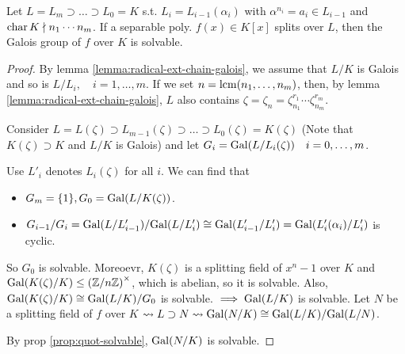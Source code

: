 \begin{theorem}[Part A] \label{thm:solvable-part-a}
  Let $L = L_m \supset \dots \supset L_0 = K$ s.t. $L_i = L_{i-1}(\alpha_i)$
  with $\alpha^{n_i} = a_i \in L_{i-1}$ and $\operatorname{char} K \nmid n_1\cdots n_m$.
  If a separable poly. $f(x) \in K[x]$ splits over $L$, then the Galois group
  of $f$ over $K$ is solvable.
  
  \begin{proof}
    By lemma \ref{lemma:radical-ext-chain-galois}, we assume that $L/K$ is
    Galois and so is $L/L_i, \quad i=1,\dots,m$.
    If we set $n = \operatorname{lcm}(n_1, \dots, n_m)$, then, by lemma \ref{lemma:radical-ext-chain-galois},
    $L$ also contains $\zeta = \zeta_n = \zeta_{n_1}^{r_1} \cdots \zeta_{n_m}^{r_m}$.

    Consider $L = L(\zeta) \supset L_{m-1}(\zeta) \supset \dots \supset
    L_0(\zeta) = K(\zeta)$ (Note that $K(\zeta) \supset K$ and $L/K$ is Galois)
    and let $G_i = \operatorname{Gal}(L/L_i(\zeta)) \quad i = 0, \dots, m$.

    Use $L'_i$ denotes $L_i(\zeta)$ for all $i$. We can find that
    \begin{itemize}
      \item $G_m = \{1\}, G_0 = \operatorname{Gal}(L/K(\zeta))$.
      \item ${G_{i-1}}/{G_i} = {\operatorname{Gal}(L/L'_{i-1})}/{\operatorname{Gal}(L/L'_i)}
        \cong \operatorname{Gal}(L'_{i-1} / L'_i) =  \operatorname{Gal}(L'_i(\alpha_i) / L'_i)$ is cyclic.
    \end{itemize}
    So $G_0$ is solvable.
    Moreoevr, $K(\zeta)$ is a splitting field of $x^n - 1$ over $K$ and
    $\operatorname{Gal}(K(\zeta)/K) \le \left({\mathbb{Z}}/{n\mathbb{Z}}\right)^\times$, which is
    abelian, so it is solvable. Also, $\operatorname{Gal}(K(\zeta)/K) \cong {\operatorname{Gal}(L/K)}/{G_0}$
    is solvable. $\implies \operatorname{Gal}(L/K)$ is solvable.
    Let $N$ be a splitting field of $f$ over $K$ $\leadsto L \supset N \leadsto
    \operatorname{Gal}(N/K) \cong {\operatorname{Gal}(L/K)}/{\operatorname{Gal}(L/N)}$.

    By prop \ref{prop:quot-solvable}, $\operatorname{Gal}(N/K)$ is solvable.
  \end{proof}
\end{theorem}

